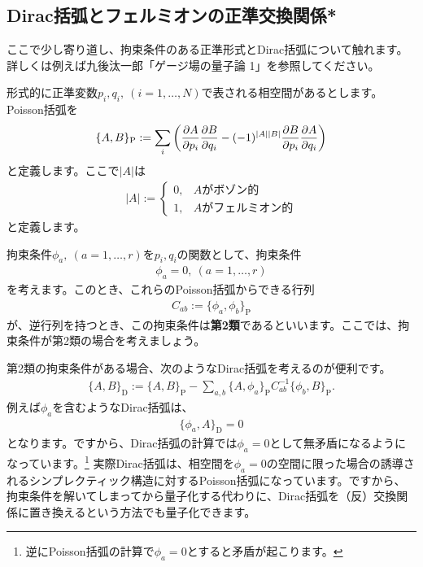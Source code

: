 \documentclass[report,paper=a4, fontsize=12pt, line_length=16cm, number_of_lines=34,dvipdfmx]{jlreq}
\numberwithin{equation}{chapter}
\numberwithin{equation}{section}
\newcommand{\kyou}[1]{{\sffamily \bfseries #1}}
\newcommand{\pbk}[1]{\{#1\}_{\mathrm{P}}}
\newcommand{\dbk}[1]{\{#1\}_{\mathrm{D}}}
\begin{document}
\subsection{Dirac括弧とフェルミオンの正準交換関係*}
ここで少し寄り道し、拘束条件のある正準形式とDirac括弧について触れます。詳しくは例えば九後汰一郎「ゲージ場の量子論 1」を参照してください。

形式的に正準変数$p_i,q_i,\ (i=1,\dots,N)$で表される相空間があるとします。Poisson括弧を
\begin{align}
  \pbk{A,B}:=\sum_{i}\left(\pdv{A}{p_i}\pdv{B}{q_i}-(-1)^{|A||B|}\pdv{B}{p_i}\pdv{A}{q_i}\right)
\end{align}
と定義します。ここで$|A|$は
\begin{align}
  |A|:=\begin{cases}
    0,&A\text{がボゾン的}\\
    1,&A\text{がフェルミオン的}
  \end{cases}
\end{align}
と定義します。

拘束条件$\phi_{a},\ (a=1,\dots,r)$を$p_i,q_i$の関数として、拘束条件
\begin{align}
  \phi_{a}=0,\ (a=1,\dots,r)
\end{align}
を考えます。このとき、これらのPoisson括弧からできる行列
\begin{align}
  C_{ab}:=\pbk{\phi_a,\phi_b}
\end{align}
が、逆行列を持つとき、この拘束条件は\kyou{第2類}であるといいます。ここでは、拘束条件が第2類の場合を考えましょう。

第2類の拘束条件がある場合、次のようなDirac括弧を考えるのが便利です。
\begin{align}
  \dbk{A,B}:=\pbk{A,B}-\sum_{a,b} \pbk{A,\phi_a} C^{-1}_{ab} \pbk{\phi_b,B}.
\end{align}
例えば$\phi_a$を含むようなDirac括弧は、
\begin{align}
  \dbk{\phi_a,A}=0
\end{align}
となります。ですから、Dirac括弧の計算では$\phi_a=0$として無矛盾になるようになっています。\footnote{逆にPoisson括弧の計算で$\phi_a=0$とすると矛盾が起こります。}
実際Dirac括弧は、相空間を$\phi_a=0$の空間に限った場合の誘導されるシンプレクティック構造に対するPoisson括弧になっています。ですから、拘束条件を解いてしまってから量子化する代わりに、Dirac括弧を（反）交換関係に置き換えるという方法でも量子化できます。
\end{document}
